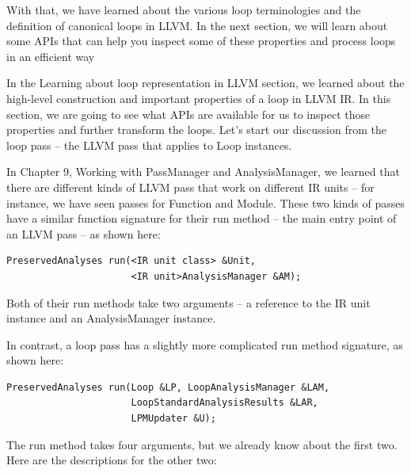 With that, we have learned about the various loop terminologies and the definition of canonical loops in LLVM. In the next section, we will learn about some APIs that can help you inspect some of these properties and process loops in an efficient way


In the Learning about loop representation in LLVM section, we learned about the high-level construction and important properties of a loop in LLVM IR. In this section, we are going to see what APIs are available for us to inspect those properties and further transform the loops. Let's start our discussion from the loop pass – the LLVM pass that applies to Loop instances.

In Chapter 9, Working with PassManager and AnalysisManager, we learned that there are different kinds of LLVM pass that work on different IR units – for instance, we have seen passes for Function and Module. These two kinds of passes have a similar function signature for their run method – the main entry point of an LLVM pass – as shown here:

\begin{lstlisting}[style=styleCXX]
PreservedAnalyses run(<IR unit class> &Unit,
					  <IR unit>AnalysisManager &AM);
\end{lstlisting}

Both of their run methods take two arguments – a reference to the IR unit instance and an AnalysisManager instance.

In contrast, a loop pass has a slightly more complicated run method signature, as
shown here:

\begin{lstlisting}[style=styleCXX]
PreservedAnalyses run(Loop &LP, LoopAnalysisManager &LAM,
					  LoopStandardAnalysisResults &LAR,
					  LPMUpdater &U);
\end{lstlisting}

The run method takes four arguments, but we already know about the first two. Here are the descriptions for the other two:

